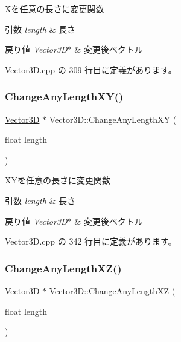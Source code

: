 Xを任意の長さに変更関数 


\begin{DoxyParams}{引数}
{\em length} & 長さ \\
\hline
\end{DoxyParams}

\begin{DoxyRetVals}{戻り値}
{\em Vector3\+D$\ast$} & 変更後ベクトル \\
\hline
\end{DoxyRetVals}


 Vector3\+D.\+cpp の 309 行目に定義があります。

\mbox{\label{class_vector3_d_a15f0c8fd120fe271e2b87115015e96f8}} 
\subsubsection{\texorpdfstring{Change\+Any\+Length\+X\+Y()}{ChangeAnyLengthXY()}}
{\footnotesize\ttfamily \mbox{\hyperlink{class_vector3_d}{Vector3D}} $\ast$ Vector3\+D\+::\+Change\+Any\+Length\+XY (\begin{DoxyParamCaption}\item[{float}]{length }\end{DoxyParamCaption})}



X\+Yを任意の長さに変更関数 


\begin{DoxyParams}{引数}
{\em length} & 長さ \\
\hline
\end{DoxyParams}

\begin{DoxyRetVals}{戻り値}
{\em Vector3\+D$\ast$} & 変更後ベクトル \\
\hline
\end{DoxyRetVals}


 Vector3\+D.\+cpp の 342 行目に定義があります。

\mbox{\label{class_vector3_d_a99c8f6195ee59955b562cb746520a6b4}} 
\subsubsection{\texorpdfstring{Change\+Any\+Length\+X\+Z()}{ChangeAnyLengthXZ()}}
{\footnotesize\ttfamily \mbox{\hyperlink{class_vector3_d}{Vector3D}} $\ast$ Vector3\+D\+::\+Change\+Any\+Length\+XZ (\begin{DoxyParamCaption}\item[{float}]{length }\end{DoxyParamCaption})}



